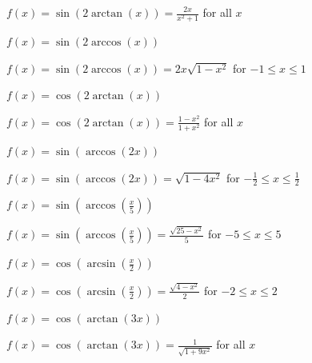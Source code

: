 \documentclass{ximera}
\begin{document}
\begin{question}
\begin{problem}
\begin{solution}
$f(x) =\sin \left( 2 \arctan \left( x \right) \right) = \frac{2x}{x^{2} + 1}$ for all $x$
\end{solution}
\end{problem}

\begin{problem}
$f(x) = \sin \left( 2 \arccos \left( x \right) \right)$

$f(x) =\sin \left( 2 \arccos \left( x \right) \right) = 2x\sqrt{1-x^2}$  for $-1 \leq x \leq 1$
\end{problem}

\begin{problem}
$f(x) = \cos \left( 2 \arctan \left( x \right) \right)$ 

\begin{solution}
$f(x) =\cos \left( 2 \arctan \left( x \right) \right) = \frac{1 - x^{2}}{1 + x^{2}}$ for all $x$
\end{solution}
\end{problem}

\begin{problem}
$f(x) = \sin(\arccos(2x))$

\begin{solution}
$f(x) =\sin(\arccos(2x)) = \sqrt{1-4x^2}$ for $-\frac{1}{2} \leq x \leq \frac{1}{2}$
\end{solution}
\end{problem}

\begin{problem}
$f(x) = \sin\left(\arccos\left(\frac{x}{5}\right)\right)$

\begin{solution}
$f(x) =\sin\left(\arccos\left(\frac{x}{5}\right)\right) = \frac{\sqrt{25-x^2}}{5}$ for $-5 \leq x \leq 5$
\end{solution}
\end{problem}

\begin{problem}
$f(x) = \cos\left(\arcsin\left(\frac{x}{2}\right)\right)$

\begin{solution}
$f(x) =\cos\left(\arcsin\left(\frac{x}{2}\right)\right) = \frac{\sqrt{4-x^2}}{2}$ for $-2 \leq x \leq 2$
\end{solution}
\end{problem}

\begin{problem}
$f(x) = \cos\left(\arctan\left(3x\right)\right)$

\begin{solution}
$f(x) =\cos\left(\arctan\left(3x\right)\right) = \frac{1}{\sqrt{1+9x^{2}}}$ for all $x$
\end{solution}
\end{problem}


\end{question}
\end{document}
